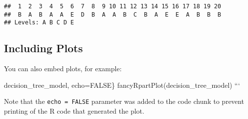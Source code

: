 \documentclass[]{article}
\begin{document}
\begin{verbatim}
##  1  2  3  4  5  6  7  8  9 10 11 12 13 14 15 16 17 18 19 20 
##  B  A  B  A  A  E  D  B  A  A  B  C  B  A  E  E  A  B  B  B 
## Levels: A B C D E
\end{verbatim}

\subsection{Including Plots}\label{including-plots}

You can also embed plots, for example:

decision\_tree\_model, echo=FALSE\}
fancyRpartPlot(decision\_tree\_model) ```

Note that the \texttt{echo\ =\ FALSE} parameter was added to the code
chunk to prevent printing of the R code that generated the plot.
\end{document}
